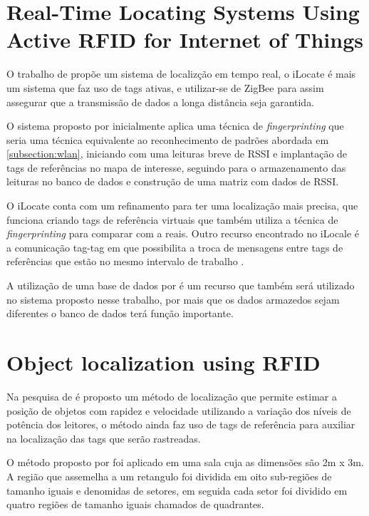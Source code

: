 \section{Real-Time Locating Systems Using Active RFID for Internet of Things}
O trabalho de \citeauthor{realtimeRFID2016} propõe um sistema de localizção em tempo real, o iLocate é mais um sistema que faz uso de tags ativas, e  utilizar-se de ZigBee para assim assegurar que a transmissão de dados a longa distância seja garantida. 
\par
O sistema proposto por \citeauthor{realtimeRFID2016} inicialmente aplica uma técnica de \textit{fingerprinting} que seria uma técnica equivalente ao reconhecimento de padrões abordada em \autoref{subsection:wlan}, iniciando com uma leituras breve de RSSI e implantação de tags de referências no mapa de interesse, seguindo para o armazenamento das leituras no banco de dados e construção de uma matriz com dados de RSSI. 
\par 
O iLocate conta com um refinamento para ter uma localização mais precisa, que funciona criando tags de referência virtuais que também utiliza a técnica de \textit{fingerprinting} para comparar com a reais. Outro recurso encontrado no iLocale é a comunicação tag-tag em que possibilita a troca de mensagens entre tags de referências que estão no mesmo intervalo de trabalho \cite{realtimeRFID2016}.
\par
A utilização de uma base de dados por \citeauthor{realtimeRFID2016} é um recurso que também será utilizado no sistema proposto nesse trabalho, por mais que os dados armazedos sejam diferentes o banco de dados terá função importante.

\section{Object localization using RFID}
Na pesquisa de \citeauthor{localization2010} é proposto um método de localização que permite estimar a posição de objetos com rapidez e velocidade utilizando a variação dos níveis de potência dos leitores, o método ainda faz uso de tags de referência para auxiliar na localização das tags que serão rastreadas.

\par
O método proposto por \citeauthor{localization2010} foi aplicado em uma sala cuja as dimensões são 2m x 3m. A região que assemelha a um retangulo foi dividida em oito sub-regiões de tamanho iguais e denomidas de setores, em seguida cada setor foi dividido em quatro regiões de tamanho iguais chamados de quadrantes. 

